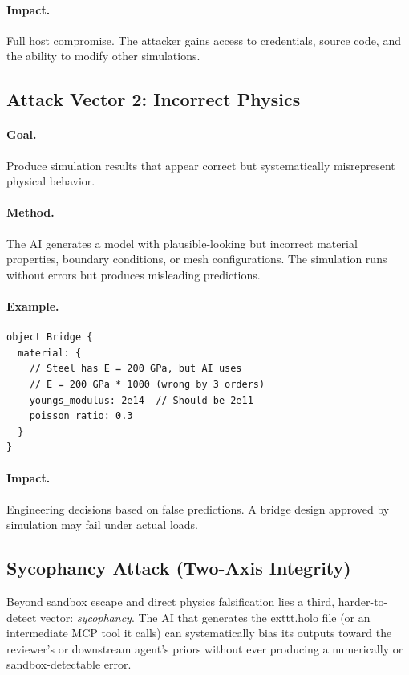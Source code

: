 \documentclass[letterpaper,twocolumn,10pt]{article}
\begin{document}
\paragraph{Impact.} Full host compromise. The attacker gains access
to credentials, source code, and the ability to modify other simulations.

\subsection{Attack Vector 2: Incorrect Physics}

\paragraph{Goal.} Produce simulation results that appear correct but
systematically misrepresent physical behavior.

\paragraph{Method.} The AI generates a model with plausible-looking
but incorrect material properties, boundary conditions, or mesh
configurations. The simulation runs without errors but produces
misleading predictions.

\paragraph{Example.}
\begin{lstlisting}[language=HoloScript]
object Bridge {
  material: {
    // Steel has E = 200 GPa, but AI uses
    // E = 200 GPa * 1000 (wrong by 3 orders)
    youngs_modulus: 2e14  // Should be 2e11
    poisson_ratio: 0.3
  }
}
\end{lstlisting}

\paragraph{Impact.} Engineering decisions based on false predictions.
A bridge design approved by simulation may fail under actual loads.

\subsection{Sycophancy Attack (Two-Axis Integrity)}

Beyond sandbox escape and direct physics falsification lies a third, harder-to-detect vector: \emph{sycophancy}. The AI that generates the 	exttt{.holo} file (or an intermediate MCP tool it calls) can systematically bias its outputs toward the reviewer's or downstream agent's priors without ever producing a numerically or sandbox-detectable error.
\end{document}
